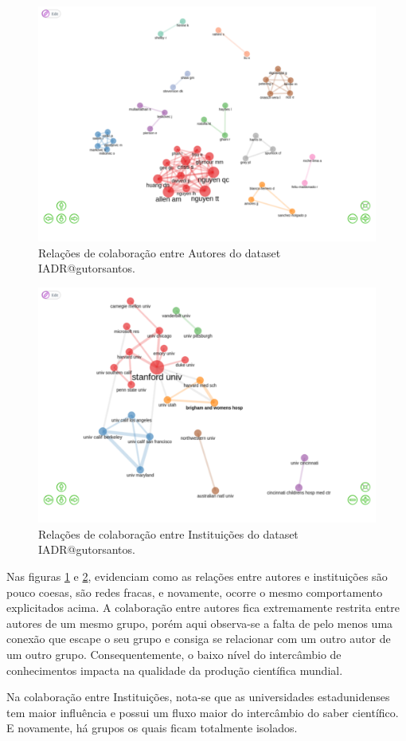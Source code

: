 \begin{figure}
    \centering
\includegraphics[angle=0,width=1\textwidth]{experiments/gutorsantos/AnaliseBibliometrica/IAeDiscriminacao/imgs/CollaborationAuthors.png}
    \caption{Relações de colaboração entre Autores do dataset IADR@gutorsantos.}
    \label{fig:IADR@gutorsantos:CollabAuthor}
\end{figure}

\begin{figure}
    \centering
\includegraphics[angle=0,width=1\textwidth]{experiments/gutorsantos/AnaliseBibliometrica/IAeDiscriminacao/imgs/CollaborationInst.png}
    \caption{Relações de colaboração entre Instituições do dataset IADR@gutorsantos.}
    \label{fig:IADR@gutorsantos:CollabInst}
\end{figure}

Nas figuras \ref{fig:IADR@gutorsantos:CollabAuthor} e \ref{fig:IADR@gutorsantos:CollabInst}, evidenciam como as relações entre autores e instituições são pouco coesas, são redes fracas, e novamente, ocorre o mesmo comportamento explicitados acima. A colaboração entre autores fica extremamente restrita entre autores de um mesmo grupo, porém aqui observa-se a falta de pelo menos uma conexão que escape o seu grupo e consiga se relacionar com um outro autor de um outro grupo. Consequentemente, o baixo nível do intercâmbio de conhecimentos impacta na qualidade da produção científica mundial. 


Na colaboração entre Instituições, nota-se que as universidades estadunidenses tem maior influência e possui um fluxo maior do intercâmbio do saber científico. E novamente, há grupos os quais ficam totalmente isolados. 
